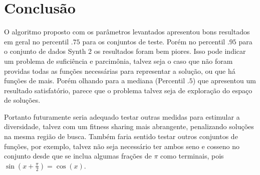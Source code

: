 \documentclass[10pt,twocolumn,letterpaper]{article}
\begin{document}
\section{Conclusão}

O algoritmo proposto com os parâmetros levantados apresentou bons resultados em geral no percentil $.75$ para os conjuntos de teste. Porém no percentil $.95$ para o conjunto de dados Synth 2 os resultados foram bem piores. Isso pode indicar um problema de suficiência e parcimônia, talvez seja o caso que não foram providas todas as funções necessárias para representar a solução, ou que há funções de mais. Porém olhando para a mediana (Percentil $.5$) que apresentou um resultado satisfatório, parece que o problema talvez seja de exploração do espaço de soluções.


Portanto futuramente seria adequado testar outras medidas para estimular a diversidade, talvez com um fitness sharing mais abrangente, penalizando soluções na mesma região de busca. Também faria sentido testar outros conjuntos de funções, por exemplo, talvez não seja necessário ter ambos seno e cosseno no conjunto desde que se inclua algumas frações de $\pi$ como terminais, pois $\sin(x+\frac{\pi}{2}) = \cos(x)$.
\end{document}
